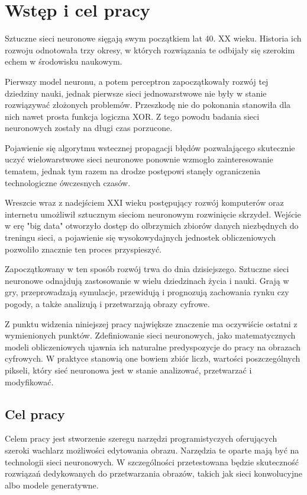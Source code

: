 \section{Wstęp i cel pracy}
  Sztuczne sieci neuronowe sięgają swym początkiem lat 40. XX wieku.
  Historia ich rozwoju odnotowała trzy okresy, w których rozwiązania te
  odbijały się szerokim echem w środowisku naukowym.

  Pierwszy model neuronu, a potem perceptron zapoczątkowały
  rozwój tej dziedziny nauki, jednak pierwsze sieci jednowarstwowe nie były w
  stanie rozwiązywać złożonych problemów. Przeszkodę nie do pokonania stanowiła
  dla nich nawet prosta funkcja logiczna XOR. Z tego powodu badania sieci
  neuronowych zostały na długi czas porzucone.


  Pojawienie się algorytmu wstecznej propagacji błędów
  pozwalającego skutecznie uczyć wielowarstwowe sieci neuronowe ponownie
  wzmogło zainteresowanie tematem, jednak tym razem na drodze postępowi stanęły
  ograniczenia technologiczne ówczesnych czasów.


  Wreszcie wraz z nadejściem XXI wieku postępujący rozwój
  komputerów oraz internetu umożliwił sztucznym sieciom neuronowym rozwinięcie
  skrzydeł. Wejście w erę "big data" otworzyło dostęp do olbrzymich zbiorów
  danych niezbędnych do treningu sieci, a pojawienie się wysokowydajnych
  jednostek obliczeniowych pozwoliło znacznie ten proces przyspieszyć.


  Zapoczątkowany w ten sposób rozwój trwa do dnia dzisiejszego.
  Sztuczne sieci neuronowe odnajdują zastosowanie w wielu dziedzinach życia i
  nauki. Grają w gry, przeprowadzają symulacje, przewidują i prognozują
  zachowania rynku czy pogody, a także analizują i przetwarzają obrazy cyfrowe.


  Z punktu widzenia niniejszej pracy największe znaczenie ma
  oczywiście ostatni z wymienionych punktów. Zdefiniowanie sieci neuronowych,
  jako matematycznych modeli obliczeniowych ujawnia ich naturalne predyspozycje
  do pracy na obrazach cyfrowych. W praktyce stanowią one bowiem zbiór liczb,
  wartości poszczególnych pikseli, który sieć neuronowa jest w stanie
  analizować, przetwarzać i modyfikować.

  \subsection{Cel pracy}
    Celem pracy jest stworzenie szeregu narzędzi programistyczych
    oferujących szeroki wachlarz możliwości edytowania obrazu. Narzędzia te
    oparte mają być na technologii sieci neuronowych. W szczególności
    przetestowana będzie skuteczność rozwiązań dedykowanych do przetwarzania
    obrazów, takich jak sieci konwolucyjne albo modele generatywne.

